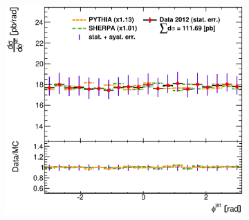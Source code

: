 \documentclass[12pt, twoside]{article}
\numberwithin{equation}{section}
\numberwithin{figure}{section}
\newenvironment{changemargin}[2]{%
\begin{list}{}{%
\setlength{\topsep}{0pt}%
\setlength{\leftmargin}{#1}%
\setlength{\rightmargin}{#2}%
\setlength{\listparindent}{\parindent}%
\setlength{\itemindent}{\parindent}%
\setlength{\parsep}{\parskip}%
}%
\item[]}{\end{list}}
\begin{document}
\begin{figure}
\begin{changemargin}{-1.0cm}{-0.75cm}
\begin{changemargin}{-0.75cm}{-1.0cm}
\begin{subfigure}[b]{0.37\textwidth}
            \subcaption{}
            \label{fig:DiffCrossSectRapidityJet}
        \end{subfigure}
        \begin{subfigure}[b]{0.37\textwidth}
            \includegraphics[width=\textwidth]{./images/DifferentialCrossSections/DIFF_CRSS_SEC-106.eps}
            \subcaption{}
            \label{fig:DiffCrossSectPhiJet}
        \end{subfigure}


\end{changemargin}
\end{changemargin}
\end{figure}
\end{document}
